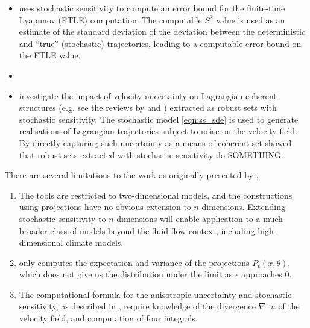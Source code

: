\begin{itemize}
	\item \citet{Balasuriya_2020_UncertaintyFinitetimeLyapunov} uses stochastic sensitivity to compute an error bound for the finite-time Lyapunov (FTLE) computation.
	      The computable \(S^2\) value is used as an estimate of the standard deviation of the deviation between the deterministic and ``true'' (stochastic) trajectories, leading to a computable error bound on the FTLE value.


	\item \citet{FangEtAl_2020_DisentanglingResolutionPrecision}


	\item \citet{BadzaEtAl_2023_HowSensitiveAre} investigate the impact of velocity uncertainty on Lagrangian coherent structures (e.g. see the reviews by \citet{BalasuriyaEtAl_2018_GeneralizedLagrangianCoherent} and \citet{HadjighasemEtAl_2017_CriticalComparisonLagrangian}) extracted as robust sets with stochastic sensitivity.
	      The stochastic model \eqref{eqn:ss_sde} is used to generate realisations of Lagrangian trajectories subject to noise on the velocity field.
	      By directly capturing such uncertainty as a means of coherent set \citet{BadzaEtAl_2023_HowSensitiveAre} showed that robust sets extracted with stochastic sensitivity do SOMETHING.

\end{itemize}
There are several limitations to the work as originally presented by \citet{Balasuriya_2020_StochasticSensitivityComputable},
\begin{enumerate}
	\item The tools are restricted to two-dimensional models, and the constructions using projections have no obvious extension to \(n\)-dimensions.
	      Extending stochastic sensitivity to \(n\)-dimensions will enable application to a much broader class of models beyond the fluid flow context, including high-dimensional climate models.

	\item \citet{Balasuriya_2020_StochasticSensitivityComputable} only computes the expectation and variance of the projections \(P_\epsilon(x,\theta)\), which does not give us the distribution under the limit as \(\epsilon\) approaches 0.

	\item The computational formula for the anisotropic uncertainty and stochastic sensitivity, as described in , require knowledge of the divergence \(\nabla\cdot u\) of the velocity field, and computation of four integrals.
\end{enumerate}

